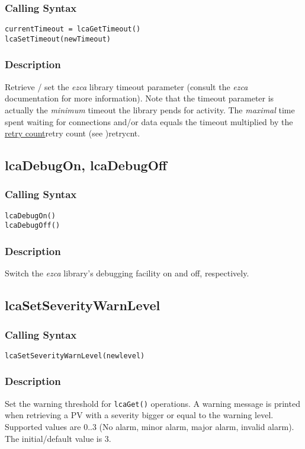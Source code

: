 \documentclass{article}
\newcommand{\ezca}{\ita{ezca}}
\newcommand{\com}[1]{{\tt #1}}
\newcommand{\pbrk}{\pagebreak[3]}
\newcommand{\ita}[1]{\emph{#1}}
\newcommand{\sevrange}{$0..3$}
\renewcommand{\sevrange}{0..3}
\renewcommand{\pbrk}{}
\begin{document}
\subsubsection{Calling Syntax}
\begin{verbatim}
currentTimeout = lcaGetTimeout()
lcaSetTimeout(newTimeout)
\end{verbatim}
\subsubsection{Description}
Retrieve / set the \ezca{} library timeout parameter (consult the \ezca{}
documentation for more information). Note that the timeout parameter is
actually the {\em minimum} timeout the library pends for activity. The
{\em maximal} time spent waiting for connections and/or data equals the
timeout multiplied by the
\hyperref[ref]{retry count}{retry count (see }{ )}{retrycnt}.

\pbrk
\subsection{lcaDebugOn, lcaDebugOff}
\subsubsection{Calling Syntax}
\begin{verbatim}
lcaDebugOn()
lcaDebugOff()
\end{verbatim}
\subsubsection{Description}
Switch the \ezca{} library's debugging facility on and off, respectively.

\pbrk
\subsection{lcaSetSeverityWarnLevel}
\label{swarnlevel}
\subsubsection{Calling Syntax}
\begin{verbatim}
lcaSetSeverityWarnLevel(newlevel)
\end{verbatim}
\subsubsection{Description}
Set the warning threshold for \com{lcaGet()} operations.
A warning message is printed when retrieving a PV with a severity bigger
or equal to the warning level. Supported values are \sevrange{} (No alarm,
minor alarm, major alarm, invalid alarm). The initial/default value is 3.
\end{document}
